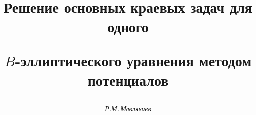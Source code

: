 




%


\newcommand{\tts}[1]{}







\setcounter{page}{64}















\author{\it Р.М.\,Мавлявиев}




\title{Решение основных краевых задач для одного


$B$-эллиптического уравнения методом потенциалов}





\date{}




\pagestyle{plain} %







\maketitle


\label{begin}








